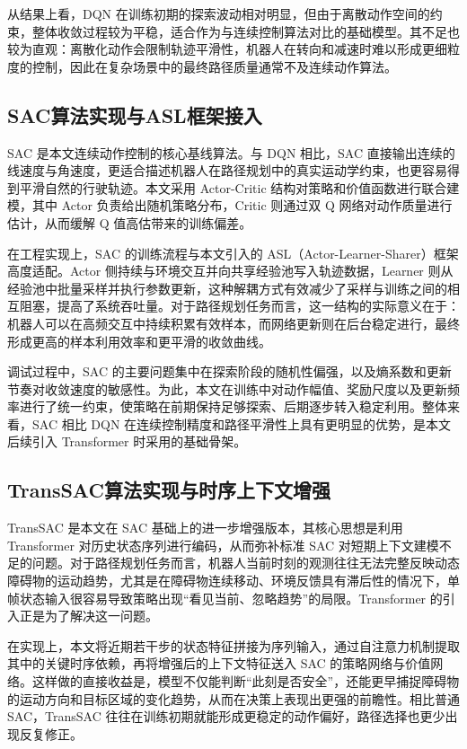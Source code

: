 从结果上看，DQN 在训练初期的探索波动相对明显，但由于离散动作空间的约束，整体收敛过程较为平稳，适合作为与连续控制算法对比的基础模型。其不足也较为直观：离散化动作会限制轨迹平滑性，机器人在转向和减速时难以形成更细粒度的控制，因此在复杂场景中的最终路径质量通常不及连续动作算法。

\subsection{SAC算法实现与ASL框架接入}

SAC 是本文连续动作控制的核心基线算法。与 DQN 相比，SAC 直接输出连续的线速度与角速度，更适合描述机器人在路径规划中的真实运动学约束，也更容易得到平滑自然的行驶轨迹。本文采用 Actor-Critic 结构对策略和价值函数进行联合建模，其中 Actor 负责给出随机策略分布，Critic 则通过双 Q 网络对动作质量进行估计，从而缓解 Q 值高估带来的训练偏差。

在工程实现上，SAC 的训练流程与本文引入的 ASL（Actor-Learner-Sharer）框架高度适配。Actor 侧持续与环境交互并向共享经验池写入轨迹数据，Learner 则从经验池中批量采样并执行参数更新，这种解耦方式有效减少了采样与训练之间的相互阻塞，提高了系统吞吐量。对于路径规划任务而言，这一结构的实际意义在于：机器人可以在高频交互中持续积累有效样本，而网络更新则在后台稳定进行，最终形成更高的样本利用效率和更平滑的收敛曲线。

调试过程中，SAC 的主要问题集中在探索阶段的随机性偏强，以及熵系数和更新节奏对收敛速度的敏感性。为此，本文在训练中对动作幅值、奖励尺度以及更新频率进行了统一约束，使策略在前期保持足够探索、后期逐步转入稳定利用。整体来看，SAC 相比 DQN 在连续控制精度和路径平滑性上具有更明显的优势，是本文后续引入 Transformer 时采用的基础骨架。

\subsection{TransSAC算法实现与时序上下文增强}

TransSAC 是本文在 SAC 基础上的进一步增强版本，其核心思想是利用 Transformer 对历史状态序列进行编码，从而弥补标准 SAC 对短期上下文建模不足的问题。对于路径规划任务而言，机器人当前时刻的观测往往无法完整反映动态障碍物的运动趋势，尤其是在障碍物连续移动、环境反馈具有滞后性的情况下，单帧状态输入很容易导致策略出现“看见当前、忽略趋势”的局限。Transformer 的引入正是为了解决这一问题。

在实现上，本文将近期若干步的状态特征拼接为序列输入，通过自注意力机制提取其中的关键时序依赖，再将增强后的上下文特征送入 SAC 的策略网络与价值网络。这样做的直接收益是，模型不仅能判断“此刻是否安全”，还能更早捕捉障碍物的运动方向和目标区域的变化趋势，从而在决策上表现出更强的前瞻性。相比普通 SAC，TransSAC 往往在训练初期就能形成更稳定的动作偏好，路径选择也更少出现反复修正。

